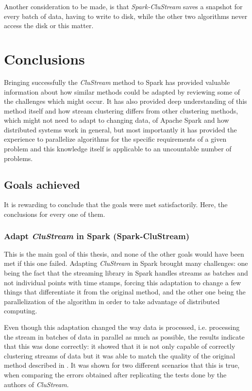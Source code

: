 \documentclass[10pt, conference, compsocconf]{IEEEtran}
\begin{document}
Another consideration to be made, is that  \textit{Spark-CluStream} saves a snapshot for every batch of data, having to write to disk, while the other two algorithms never access the disk or this matter.



\section{Conclusions}

 
Bringing successfully the \textit{CluStream} method to Spark has provided valuable information about how similar methods could be adapted by reviewing some of the challenges which might occur. It has also provided deep understanding of this method itself and how stream clustering differs from other clustering methods, which might not need to adapt to changing data, of Apache Spark and how distributed systems work in general, but most importantly it has provided the experience to parallelize algorithms for the specific requirements of a given problem and this knowledge itself is applicable to an uncountable number of problems.


\subsection{Goals achieved}

It is rewarding to conclude that the goals were met satisfactorily. Here, the conclusions for every one of them.

\subsubsection{Adapt \textit{CluStream} in Spark (Spark-CluStream)}

This is the main goal of this thesis, and none of the other goals would have been met if this one failed. Adapting \textit{CluStream} in Spark brought many challenges: one being the fact that the streaming library in Spark handles streams as batches and not individual points with time stamps, forcing this adaptation to change a few things that differentiate it from the original method, and the other one being the parallelization of the algorithm in order to take advantage of distributed computing.

Even though this adaptation changed the way data is processed, i.e. processing the stream in batches of data in parallel as much as possible, the results indicate that this was done correctly: it showed that it is not only capable of correctly clustering streams of data but it was able to match the quality of the original method described in \cite{clustreamOrig}. It was shown for two different scenarios that this is true, when comparing the errors obtained after replicating the tests done by the authors of \textit{CluStream}.
\end{document}
